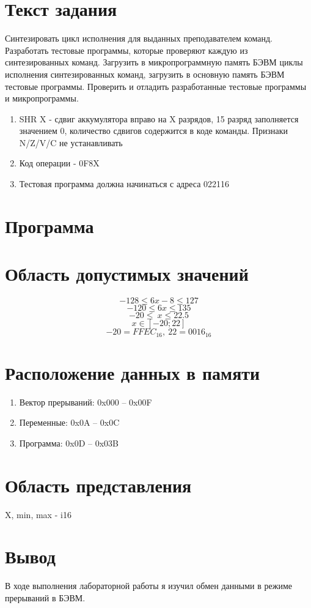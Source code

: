 \documentclass{article}
\begin{document}
\itmo[
  variant=129,
  labn=7,
  discipline=Основы профессиональной деятельности,
  group=P3115,
  student=Владимир Мацюк,
  teacher=Абузов Ярослав Александрович,
  logo=../../lib/img/itmo.png
]


\section{Текст задания}

Синтезировать цикл исполнения для выданных преподавателем команд. Разработать тестовые программы, которые проверяют каждую из синтезированных команд. Загрузить в микропрограммную память БЭВМ циклы исполнения синтезированных команд, загрузить в основную память БЭВМ тестовые программы. Проверить и отладить разработанные тестовые программы и микропрограммы.



\begin{enumerate}
  \item SHR X - сдвиг аккумулятора вправо на X разрядов, 15 разряд заполняется значением 0, количество сдвигов содержится в коде команды. Признаки N/Z/V/C не устанавливать
  \item Код операции - 0F8X
  \item Тестовая программа должна начинаться с адреса 022116
\end{enumerate}

\section{Программа}



\section{Область допустимых значений}

$$-128 \le 6x-8 \le 127$$
$$-120 \le 6x \le 135 $$
$$-20 \le\ x \le 22.5 $$
$$x \in [-20; 22]$$
$$-20=FFEC_{16},\ 22=0016_{16}$$


\section{Расположение данных в памяти}

\begin{enumerate}
  \item Вектор прерываний: 0x000 – 0x00F
  \item Переменные: 0x0A – 0x0C
  \item Программа: 0x0D – 0x03B
\end{enumerate}


\section{Область представления}

X, min, max - i16

\section{Вывод}

В ходе выполнения лабораторной работы я изучил обмен данными в режиме прерываний в БЭВМ.
\end{document}
